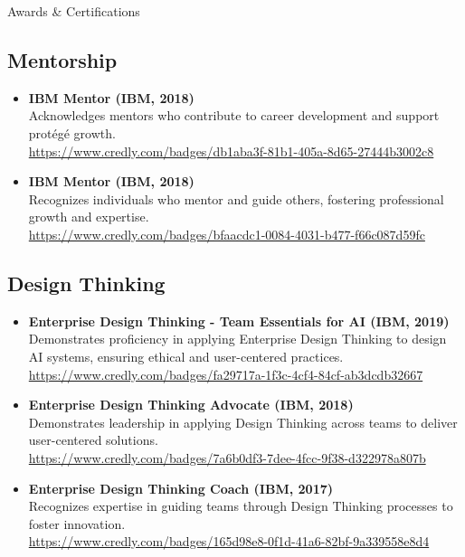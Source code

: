 \documentclass{resume} %
\begin{document}
\begin{rSection}{Awards \& Certifications}
\subsection*{Mentorship}

\begin{itemize}
    \item \textbf{IBM Mentor (IBM, 2018)} \\
    Acknowledges mentors who contribute to career development and support protégé growth. \\
    \url{https://www.credly.com/badges/db1aba3f-81b1-405a-8d65-27444b3002c8}
    
    \item \textbf{IBM Mentor (IBM, 2018)} \\
    Recognizes individuals who mentor and guide others, fostering professional growth and expertise. \\
    \url{https://www.credly.com/badges/bfaacdc1-0084-4031-b477-f66c087d59fc}
\end{itemize}

\subsection*{Design Thinking}

\begin{itemize}
    \item \textbf{Enterprise Design Thinking - Team Essentials for AI (IBM, 2019)} \\
    Demonstrates proficiency in applying Enterprise Design Thinking to design AI systems, ensuring ethical and user-centered practices. \\
    \url{https://www.credly.com/badges/fa29717a-1f3c-4cf4-84cf-ab3dcdb32667}
    
    \item \textbf{Enterprise Design Thinking Advocate (IBM, 2018)} \\
    Demonstrates leadership in applying Design Thinking across teams to deliver user-centered solutions. \\
    \url{https://www.credly.com/badges/7a6b0df3-7dee-4fcc-9f38-d322978a807b}
    
    \item \textbf{Enterprise Design Thinking Coach (IBM, 2017)} \\
    Recognizes expertise in guiding teams through Design Thinking processes to foster innovation. \\
    \url{https://www.credly.com/badges/165d98e8-0f1d-41a6-82bf-9a339558e8d4}
    

\end{itemize}
\end{rSection}
\end{document}
